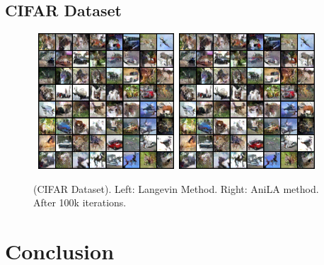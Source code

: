 \documentclass{article}
\begin{document}
\subsection{CIFAR Dataset}



\begin{figure}[h]
    \begin{center}
        \mbox{
        \includegraphics[width=2in]{figs/cifarlangevin}
        \includegraphics[width=2in]{figs/cifarlangevin}
        }
    \end{center}
    \vspace{-0.1in}
	\caption{(CIFAR Dataset). Left: Langevin Method. Right: AniLA method. After 100k iterations.}
	\label{fig:flowers}
\end{figure}

\section{Conclusion}

\newpage



\end{document}
